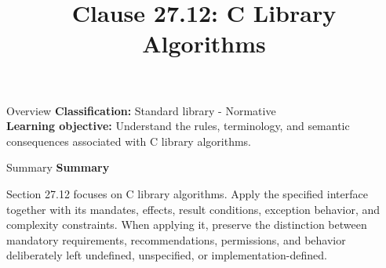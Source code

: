 \documentclass[10pt,letterpaper]{article}
\title{Clause 27.12: C Library Algorithms}
\author{}
\date{}
\begin{document}
\maketitle
\begin{CornellOverviewBox}{Overview}
\textbf{Classification:} Standard library - Normative\\[2pt]
\textbf{Learning objective:} Understand the rules, terminology, and semantic consequences associated with C library algorithms.
\end{CornellOverviewBox}\begin{CornellSummaryBox}{Summary}
{\sffamily\bfseries\color{Accent} Summary}\par\vspace{3pt}Section 27.12 focuses on C library algorithms. Apply the specified interface together with its mandates, effects, result conditions, exception behavior, and complexity constraints. When applying it, preserve the distinction between mandatory requirements, recommendations, permissions, and behavior deliberately left undefined, unspecified, or implementation-defined.
\end{CornellSummaryBox}
\end{document}
